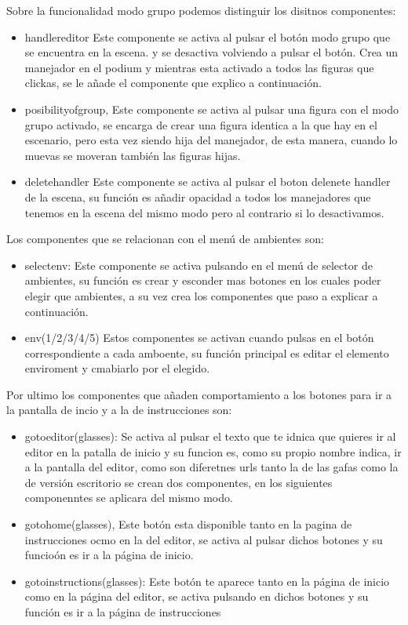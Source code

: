 \documentclass[a4paper, 12pt]{book}
\begin{document}
    
Sobre la funcionalidad modo grupo podemos distinguir los disitnos componentes:
\begin{itemize}
    \item handlereditor Este componente se activa al pulsar el botón modo grupo que se encuentra en la escena. y se desactiva volviendo a pulsar el botón. Crea un manejador en el podium y mientras esta activado a todos las figuras que clickas, se le añade el componente que explico a continuación.
    \item posibilityofgroup, Este componente se activa al pulsar una figura con el modo grupo activado, se encarga de crear una figura identica a la que hay en el escenario, pero esta vez siendo hija del manejador, de esta manera, cuando lo muevas se moveran también las figuras hijas.
    \item deletehandler Este componente se activa al pulsar el boton delenete handler de la escena, su función es añadir opacidad a todos los manejadores que tenemos en la escena del mismo modo pero al contrario si lo desactivamos.
\end{itemize}

Los componentes que se relacionan con el menú de ambientes son:
\begin{itemize}
    \item selectenv: Este componente se activa pulsando en el menú de selector de ambientes, su función es crear y esconder mas botones en los cuales poder elegir que ambientes, a su vez crea los componentes que paso a explicar a continuación.
    \item env(1/2/3/4/5) Estos componentes se activan cuando pulsas en el botón correspondiente a cada amboente, su función principal es editar el elemento enviroment y cmabiarlo por el elegido.
\end{itemize}

Por ultimo los componentes que añaden comportamiento a los botones para ir a la pantalla de incio y a la de instrucciones son:

\begin{itemize}
    \item gotoeditor(glasses): Se activa al pulsar el texto que te idnica que quieres ir al editor en la patalla de inicio y su funcion es, como su propio nombre indica, ir a la pantalla del editor, como son diferetnes urls tanto la de las gafas como la de versión escritorio se crean dos componentes, en los siguientes componenntes se aplicara del mismo modo.
    \item gotohome(glasses), Este botón esta disponible tanto en la pagina de instrucciones ocmo en la del editor, se activa al pulsar dichos botones y su funcioón es ir a la página de inicio.
    \item gotoinstructions(glasses): Este botón te aparece tanto en la página de inicio como en la página del editor, se activa pulsando en dichos botones y su función es ir a la página de instrucciones
\end{itemize}
\end{document}
